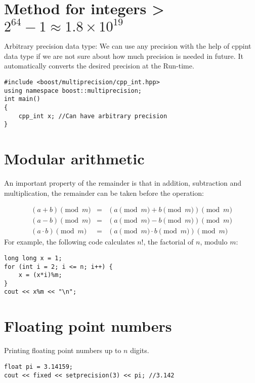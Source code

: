 \documentclass[twoside,12pt,a4paper,english]{book}
\theoremstyle{definition}
\theoremstyle{problemstyle}
\theoremstyle{problemstyle}
\theoremstyle{problemstyle}
\begin{document}
\section{Method for integers > \texorpdfstring{$2^{64} - 1 \approx 1.8\times10^{19}$}{10**19}}

Arbitrary precision data type: We can use any precision with the help of cppint data type if we are not sure about how much precision is needed in future. It automatically converts the desired precision at the Run-time.

\begin{lstlisting}
#include <boost/multiprecision/cpp_int.hpp>
using namespace boost::multiprecision;
int main()
{
    cpp_int x; //Can have arbitrary precision
}
\end{lstlisting}

\section{Modular arithmetic}

An important property of the remainder is that
in addition, subtraction and multiplication,
the remainder can be taken before the operation:

\[
\begin{array}{rcr}
(a+b) \pmod{m} & = & (a \pmod{m} + b \pmod{m}) \pmod{m} \\
(a-b) \pmod{m} & = & (a \pmod{m} - b \pmod{m}) \pmod{m} \\
(a \cdot b) \pmod{m} & = & (a \pmod{m} \cdot b \pmod{m}) \pmod{m}
\end{array}
\]
\linebreak
\linebreak
\linebreak
\linebreak
For example, the following code calculates $n!$,
the factorial of $n$, modulo $m$:
\begin{lstlisting}
long long x = 1;
for (int i = 2; i <= n; i++) {
    x = (x*i)%m;
}
cout << x%m << "\n";
\end{lstlisting}

\section{Floating point numbers}

Printing floating point numbers up to $n$ digits.

\begin{lstlisting}
float pi = 3.14159;
cout << fixed << setprecision(3) << pi; //3.142
\end{lstlisting}
\end{document}
